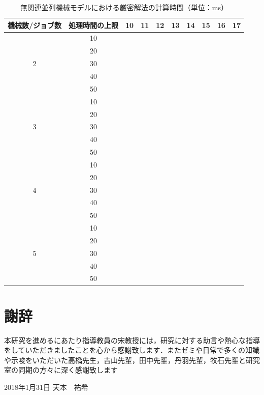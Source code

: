 \documentclass[12pt]{optlab-bachelor}
\def\氏名{天本　祐希}
\begin{document}
\begin{table}[htb]
  \setlength{\leftskip}{-15mm}
  \begin{tabular}{|c|c|c|c|c|c|c|c|c|c|} \hline
    機械数/ジョブ数 & 処理時間の上限 & 10 & 11 & 12 & 13 & 14 & 15 & 16 & 17 \\ \hline \hline
    & 10 &  &  &  &  &  &  &  &  \\ \cline{2-10}
    & 20 &  &  &  &  &  &  &  &  \\ \cline{2-10}
    2 & 30 &  &  &  &  &  &  &  &  \\ \cline{2-10}
    & 40 &  &  &  &  &  &  &  &  \\ \cline{2-10}
    & 50 &  &  &  &  &  &  &  &  \\ \hline \hline
    & 10 &  &  &  &  &  &  &  &  \\ \cline{2-10}
    & 20 &  &  &  &  &  &  &  &  \\ \cline{2-10}
    3 & 30 &  &  &  &  &  &  &  &  \\ \cline{2-10}
    & 40 &  &  &  &  &  &  &  &  \\ \cline{2-10}
    & 50 &  &  &  &  &  &  &  &  \\ \hline \hline
    & 10 &  &  &  &  &  &  &  & \\ \cline{2-10}
    & 20 &  &  &  &  &  &  &  &  \\ \cline{2-10}
    4 & 30 &  &  &  &  &  &  &  &  \\ \cline{2-10}
    & 40 &  &  &  &  &  &  &  &  \\ \cline{2-10}
    & 50 &  &  &  &  &  &  &  &  \\ \hline \hline
    & 10 &  &  &  &  &  &  &  &  \\ \cline{2-10}
    & 20 &  &  &  &  &  &  &  &  \\ \cline{2-10}
    5 & 30 &  &  &  &  &  &  &  &  \\ \cline{2-10}
    & 40 &  &  &  &  &  &  &  &  \\ \cline{2-10}
    & 50 &  &  &  &  &  &  &  &  \\ \hline \hline
  \end{tabular}
  \caption{無関連並列機械モデルにおける厳密解法の計算時間（単位：ms）}
\end{table}

\chapter*{謝辞}
本研究を進めるにあたり指導教員の宋教授には，研究に対する助言や熱心な指導をしていただきましたことを心から感謝致します．またゼミや日常で多くの知識や示唆をいただいた高橋先生，吉山先輩，田中先輩，丹羽先輩，牧石先輩と研究室の同期の方々に深く感謝致します

\begin{flushright}
  2018年1月31日 \氏名
\end{flushright}
\endmatter
\end{document}
